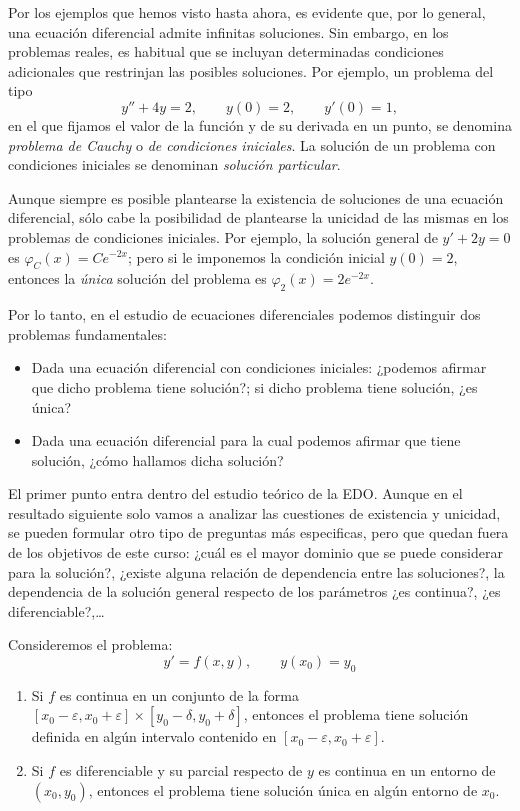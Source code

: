 Por los ejemplos que hemos visto hasta ahora, es evidente que, por lo general, una ecuación diferencial admite infinitas soluciones.
Sin embargo, en los problemas reales, es habitual que se incluyan determinadas condiciones adicionales que restrinjan las posibles soluciones.
Por ejemplo, un problema del tipo 
\[
y''+4y=2,\qquad y(0)=2, \qquad y'(0)=1,
\]
en el que fijamos el valor de la función y de su derivada en un punto,
se denomina \emph{problema de Cauchy} o \emph{de condiciones iniciales}.
La solución de un problema con condiciones iniciales se denominan \emph{solución particular}.

Aunque siempre es posible plantearse la existencia de soluciones de una ecuación diferencial, sólo cabe la posibilidad de plantearse la unicidad de las mismas en los problemas de condiciones iniciales.
Por ejemplo, la solución general de $y'+2y=0$ es $\varphi_C(x)=Ce^{-2x}$;
pero si le imponemos la condición inicial $y(0)=2$, entonces la \emph{única} solución del problema es $\varphi_2(x)=2e^{-2x}$.

Por lo tanto, en el estudio de ecuaciones diferenciales podemos distinguir dos problemas fundamentales:
\begin{itemize}
\item Dada una ecuación diferencial con condiciones iniciales:
¿podemos afirmar que dicho problema tiene solución?;
si dicho problema tiene solución, ¿es única?
\item Dada una ecuación diferencial para la cual podemos afirmar que tiene solución,
¿cómo hallamos dicha solución?
\end{itemize}

El primer punto entra dentro del estudio teórico de la EDO.
Aunque en el resultado siguiente solo vamos a analizar las cuestiones de existencia y unicidad, se pueden formular otro tipo de preguntas más especificas, pero que quedan fuera de los objetivos de este curso:
¿cuál es el mayor dominio que se puede considerar para la solución?,
¿existe alguna relación de dependencia entre las soluciones?,
la dependencia de la solución general respecto de los parámetros ¿es continua?, ¿es diferenciable?,\dots

\begin{teorema} Consideremos el problema:
\[
y'=f(x,y),\qquad y(x_0)=y_0
\]
\begin{enumerate}
\item Si $f$ es continua en un conjunto de la forma
$[x_0-\varepsilon,x_0+\varepsilon]\times [y_0-\delta,y_0+\delta]$, entonces el problema tiene
solución definida en algún intervalo contenido en $[x_0-\varepsilon,x_0+\varepsilon]$.
\item Si $f$ es diferenciable y su parcial respecto de $y$ es continua en un entorno de $(x_0,y_0)$, entonces el problema tiene solución única en algún entorno de $x_0$.
\end{enumerate}
\end{teorema}

